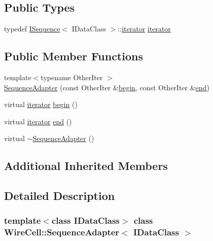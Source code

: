 \subsection*{Public Types}
\begin{DoxyCompactItemize}
\item 
typedef \hyperlink{class_wire_cell_1_1_i_sequence}{I\+Sequence}$<$ I\+Data\+Class $>$\+::\hyperlink{class_wire_cell_1_1_sequence_adapter_aa277763ddf95ebdd40224c15863b2bbd}{iterator} \hyperlink{class_wire_cell_1_1_sequence_adapter_aa277763ddf95ebdd40224c15863b2bbd}{iterator}
\end{DoxyCompactItemize}
\subsection*{Public Member Functions}
\begin{DoxyCompactItemize}
\item 
{\footnotesize template$<$typename Other\+Iter $>$ }\\\hyperlink{class_wire_cell_1_1_sequence_adapter_a933b507395ec8309d0cbc54638a8bee5}{Sequence\+Adapter} (const Other\+Iter \&\hyperlink{class_wire_cell_1_1_sequence_adapter_ab9d7082a27f17937871ef9ff97e1b8ad}{begin}, const Other\+Iter \&\hyperlink{class_wire_cell_1_1_sequence_adapter_a7b3736b3876b4a2091254e42cb5d2900}{end})
\item 
virtual \hyperlink{class_wire_cell_1_1_sequence_adapter_aa277763ddf95ebdd40224c15863b2bbd}{iterator} \hyperlink{class_wire_cell_1_1_sequence_adapter_ab9d7082a27f17937871ef9ff97e1b8ad}{begin} ()
\item 
virtual \hyperlink{class_wire_cell_1_1_sequence_adapter_aa277763ddf95ebdd40224c15863b2bbd}{iterator} \hyperlink{class_wire_cell_1_1_sequence_adapter_a7b3736b3876b4a2091254e42cb5d2900}{end} ()
\item 
virtual \hyperlink{class_wire_cell_1_1_sequence_adapter_a1ea7425070e3087980a1578d74c7e46d}{$\sim$\+Sequence\+Adapter} ()
\end{DoxyCompactItemize}
\subsection*{Additional Inherited Members}


\subsection{Detailed Description}
\subsubsection*{template$<$class I\+Data\+Class$>$\newline
class Wire\+Cell\+::\+Sequence\+Adapter$<$ I\+Data\+Class $>$}

